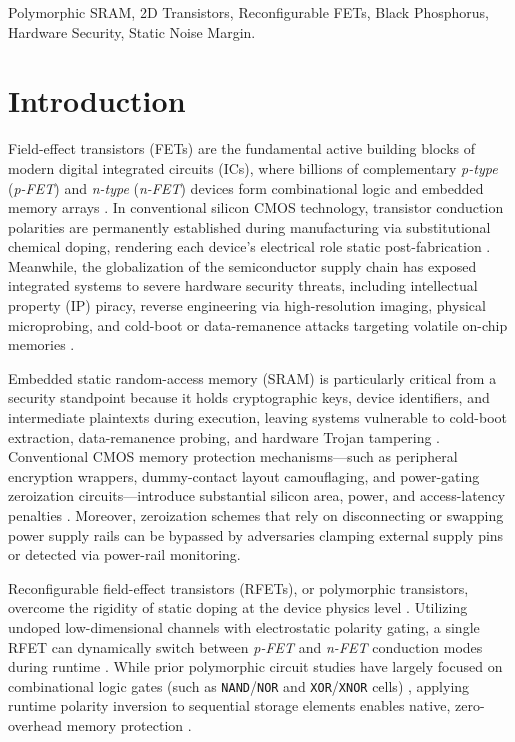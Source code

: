 \documentclass[conference]{IEEEtran}
\begin{document}
\begin{IEEEkeywords}
Polymorphic SRAM, 2D Transistors, Reconfigurable FETs, Black Phosphorus, Hardware Security, Static Noise Margin.
\end{IEEEkeywords}

\section{Introduction}
Field-effect transistors (FETs) are the fundamental active building blocks of modern digital integrated circuits (ICs), where billions of complementary \textit{p-type} (\textit{p-FET}) and \textit{n-type} (\textit{n-FET}) devices form combinational logic and embedded memory arrays \cite{sze2007, rabaey2003, moore1998}. In conventional silicon CMOS technology, transistor conduction polarities are permanently established during manufacturing via substitutional chemical doping, rendering each device's electrical role static post-fabrication \cite{sze2007, wu2021}. Meanwhile, the globalization of the semiconductor supply chain has exposed integrated systems to severe hardware security threats, including intellectual property (IP) piracy, reverse engineering via high-resolution imaging, physical microprobing, and cold-boot or data-remanence attacks targeting volatile on-chip memories \cite{rostami2014, shamsi2019, quadir2016, halderman2009lest}.

Embedded static random-access memory (SRAM) is particularly critical from a security standpoint because it holds cryptographic keys, device identifiers, and intermediate plaintexts during execution, leaving systems vulnerable to cold-boot extraction, data-remanence probing, and hardware Trojan tampering \cite{halderman2009lest, bhunia2014hardware}. Conventional CMOS memory protection mechanisms---such as peripheral encryption wrappers, dummy-contact layout camouflaging, and power-gating zeroization circuits---introduce substantial silicon area, power, and access-latency penalties \cite{vijayakumar2016, xie2017, yasin2016, kamali2020}. Moreover, zeroization schemes that rely on disconnecting or swapping power supply rails can be bypassed by adversaries clamping external supply pins or detected via power-rail monitoring.

Reconfigurable field-effect transistors (RFETs), or polymorphic transistors, overcome the rigidity of static doping at the device physics level \cite{heinzig2012, wu2021, mikolajick2017, mikolajick2021}. Utilizing undoped low-dimensional channels with electrostatic polarity gating, a single RFET can dynamically switch between \textit{p-FET} and \textit{n-FET} conduction modes during runtime \cite{nakaharai2015, demarchi2012, rhee2025}. While prior polymorphic circuit studies have largely focused on combinational logic gates (such as \texttt{NAND}/\texttt{NOR} and \texttt{XOR}/\texttt{XNOR} cells) \cite{resta2018, benjamaa2011, galderisi2022, bi2016}, applying runtime polarity inversion to sequential storage elements enables native, zero-overhead memory protection \cite{wu2021}.
\end{document}
